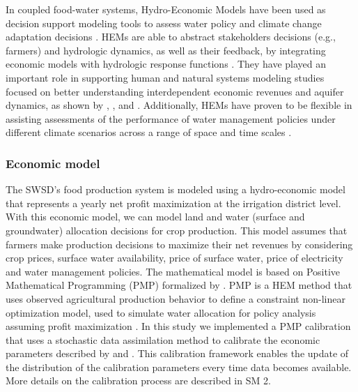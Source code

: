 \documentclass[a4paper,fleqn]{cas-sc}
\begin{document}
In coupled food-water systems, Hydro-Economic Models have been used as decision support modeling tools to assess water policy and climate change adaptation decisions \citep{ward_hydroeconomic_2021,harou_hydro-economic_2009}. HEMs are able to abstract stakeholders decisions (e.g., farmers) and hydrologic dynamics, as well as their feedback, by integrating economic models with hydrologic response functions \citep{harou_hydro-economic_2009}. They have played an important role in supporting human and natural systems modeling studies focused on better understanding interdependent economic revenues and aquifer dynamics, as shown by \citet{macewan_hydroeconomic_2017}, \citet{afshar_multi-objective_2020}, \citet{graveline_combining_2020} and \citet{rodriguez-flores_global_2022}. Additionally, HEMs have proven to be flexible in assisting assessments of the performance of water management policies under different climate scenarios across a range of space and time scales \citep{partida_hydro-economic_2023}.

\subsubsection{Economic model}\label{sct:hem}

The SWSD's food production system is modeled using a hydro-economic model \citep{harou_hydro-economic_2009} that represents a yearly net profit maximization at the irrigation district level. With this economic model, we can model land and water (surface and groundwater) allocation decisions for crop production. This model assumes that farmers make production decisions to maximize their net revenues by considering crop prices, surface water availability, price of surface water, price of electricity and water management policies. The mathematical model is based on Positive Mathematical Programming (PMP) formalized by \citet{howitt_calibration_1995}. PMP is a HEM method that uses observed agricultural production behavior to define a constraint non-linear optimization model, used to simulate water allocation for policy analysis assuming profit maximization \citep{graveline_combining_2020,macewan_hydroeconomic_2017,howitt_calibrating_2012,rodriguez-flores_insights_2019}. In this study we implemented a PMP calibration that uses a stochastic data assimilation method to calibrate the economic parameters described by \citet{maneta_stochastic_2014} and \citet{maneta_satellite-driven_2020}. This calibration framework enables the update of the distribution of the calibration parameters every time data becomes available. More details on the calibration process are described in SM 2. 
\end{document}
